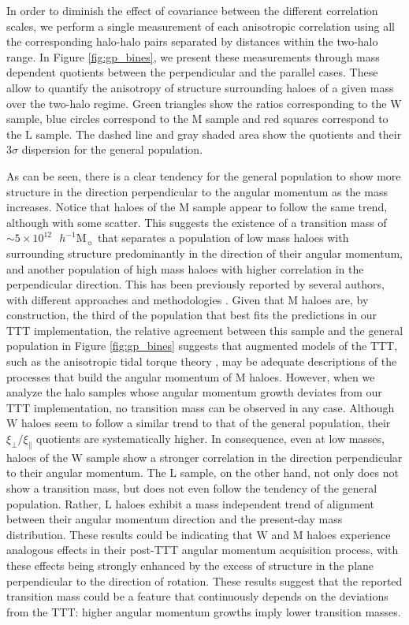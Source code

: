 \documentclass[fleqn,usenatbib]{mnras}
\newcommand{\hMsun}{{\textrm{ $h^{-1}$M$_{\sun}$}}}
\newcommand{\Wh}{\mathrm{W}}
\newcommand{\Lh}{\mathrm{L}}
\newcommand{\Mh}{\mathrm{M}}
\begin{document}
In order to diminish the effect of covariance between the different correlation scales, we perform a single measurement of each anisotropic correlation using all the corresponding halo-halo pairs separated by distances within the two-halo range. In Figure \ref{fig:gp_bines}, we present these measurements through mass dependent quotients between the perpendicular and the parallel cases. These allow to quantify the anisotropy of structure surrounding haloes of a given mass over the two-halo regime. Green triangles show the ratios corresponding to the $\Wh$ sample, blue circles correspond to the $\Mh$ sample and red squares correspond to the $\Lh$ sample. The dashed line and gray shaded area show the quotients and their $3\sigma$ dispersion for the general population. 

As can be seen, there is a clear tendency for the general population to show more structure in the direction perpendicular to the angular momentum as the mass increases. Notice that haloes of the $\Mh$ sample appear to follow the same trend, although with some scatter. This suggests the existence of a {transition mass} of $\sim 5\times 10^{12}\hMsun$ that separates a population of low mass haloes with surrounding structure predominantly in the direction of their angular momentum, and another population of high mass haloes with higher correlation in the perpendicular direction. This has been previously reported by several authors, with different approaches and methodologies \citep{aragoncalvoetal2007,codisetal2015,pazetal2008}. Given that $\Mh$ haloes are, by construction, the third of the population that best fits the predictions in our TTT implementation, the relative agreement between this sample and the general population in Figure \ref{fig:gp_bines} suggests that augmented models of the TTT, such as the anisotropic tidal torque theory \citep{codisetal2015}, may be adequate descriptions of the processes that build the angular momentum of $\Mh$ haloes. However, when we analyze the halo samples whose angular momentum growth deviates from our TTT implementation, no transition mass can be observed in any case. Although $\Wh$ haloes seem to follow a similar trend to that of the general population, their $\xi_\perp/\xi_\parallel$ quotients are systematically higher. In consequence, even at low masses, haloes of the $\Wh$ sample show a stronger correlation in the direction perpendicular to their angular momentum. The $\Lh$ sample, on the other hand, not only does not show a transition mass, but does not even follow the tendency of the general population. Rather, $\Lh$ haloes exhibit a mass independent trend of alignment between their angular momentum direction and the present-day mass distribution. These results could be indicating that $\Wh$ and $\Mh$ haloes experience analogous effects in their post-TTT angular momentum acquisition process, with these effects being strongly enhanced by the excess of structure in the plane perpendicular to the direction of rotation. These results suggest that the reported transition mass could be a feature that continuously depends on the deviations from the TTT: higher angular momentum growths imply lower transition masses.
\end{document}
